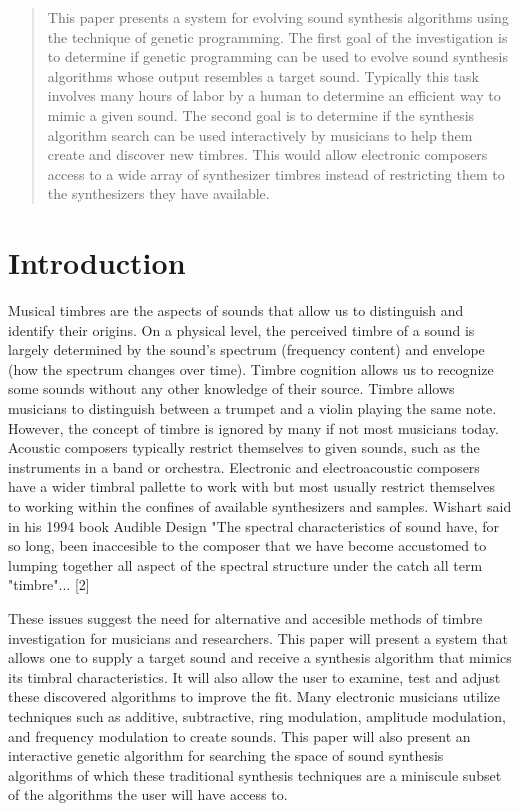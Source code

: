 \documentclass[12pt]{article}
\begin{document}
\maketitle

\begin{abstract}
This paper presents a system for evolving sound synthesis algorithms using the technique of genetic programming. The first goal of the investigation is to determine if genetic programming can be used to evolve sound synthesis algorithms whose output resembles a target sound. Typically this task involves many hours of labor by a human to determine an efficient way to mimic a given sound. The second goal is to determine if the synthesis algorithm search can be used interactively by musicians to help them create and discover new timbres. This would allow electronic composers access to a wide array of synthesizer timbres instead of restricting them to the synthesizers they have available.
\end{abstract}

\section{Introduction}
	Musical timbres are the aspects of sounds that allow us to distinguish and identify their origins. On a physical level, the perceived timbre of a sound is largely determined by the sound's spectrum (frequency content) and envelope (how the spectrum changes over time). Timbre cognition allows us to recognize some sounds without any other knowledge of their source. Timbre allows musicians to distinguish between a trumpet and a violin playing the same note. However, the concept of timbre is ignored by many if not most musicians today. Acoustic composers typically restrict themselves to given sounds, such as the instruments in a band or orchestra. Electronic and electroacoustic composers have a wider timbral pallette to work with but most usually restrict themselves to working within the confines of available synthesizers and samples. Wishart said in his 1994 book Audible Design "The spectral characteristics of sound have, for so long, been inaccesible to the composer that we have become accustomed to lumping together all aspect of the spectral structure under the catch all term "timbre"... [2]
	 
	These issues suggest the need for alternative and accesible methods of timbre investigation for musicians and researchers. This paper will present a system that allows one to supply a target sound and receive a synthesis algorithm that mimics its timbral characteristics. It will also allow the user to examine, test and adjust these discovered algorithms to improve the fit. Many electronic musicians utilize techniques such as additive, subtractive, ring modulation, amplitude modulation, and frequency modulation to create sounds. This paper will also present an interactive genetic algorithm for searching the space of sound synthesis algorithms of which these traditional synthesis techniques are a miniscule subset of the algorithms the user will have access to.
\end{document}
